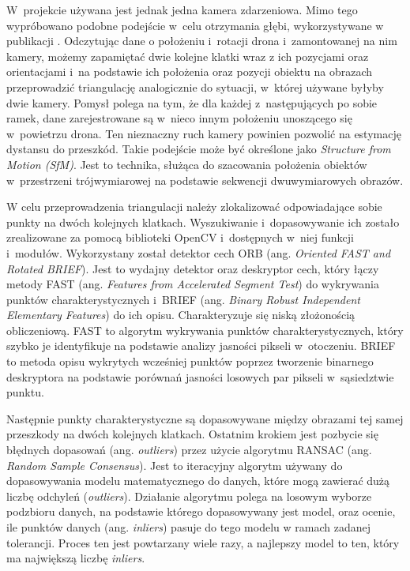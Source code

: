 W~projekcie używana jest jednak jedna kamera zdarzeniowa. Mimo tego wypróbowano podobne podejście w~celu otrzymania głębi, wykorzystywane w publikacji \cite{night_obstacle}. Odczytując dane o położeniu i~rotacji drona i~zamontowanej na nim kamery, możemy zapamiętać dwie kolejne klatki wraz z ich pozycjami oraz orientacjami i~na podstawie ich położenia oraz pozycji obiektu na obrazach przeprowadzić triangulację analogicznie do sytuacji, w~której używane byłyby dwie kamery. Pomysł polega na tym, że dla każdej z~następujących po sobie ramek, dane zarejestrowane są w~nieco innym położeniu unoszącego się w~powietrzu drona. Ten nieznaczny ruch kamery powinien pozwolić na estymację dystansu do przeszkód. Takie podejście może być określone jako \textit{Structure from Motion (SfM)}. Jest to technika, służąca do szacowania położenia obiektów w~przestrzeni trójwymiarowej na podstawie sekwencji dwuwymiarowych obrazów.


W celu przeprowadzenia triangulacji należy zlokalizować odpowiadające sobie punkty na dwóch kolejnych klatkach. Wyszukiwanie i~dopasowywanie ich zostało zrealizowane za pomocą biblioteki OpenCV i~dostępnych w~niej funkcji i~modułów. Wykorzystany został detektor cech ORB (ang. \textit{Oriented FAST and Rotated BRIEF}). Jest to wydajny detektor oraz deskryptor cech, który łączy metody FAST (ang. \textit{Features from Accelerated Segment Test}) do wykrywania punktów charakterystycznych i~BRIEF (ang. \textit{Binary Robust Independent Elementary Features}) do ich opisu. Charakteryzuje się niską złożonością obliczeniową. FAST to algorytm wykrywania punktów charakterystycznych, który szybko je identyfikuje na podstawie analizy jasności pikseli w~otoczeniu. BRIEF to metoda opisu wykrytych wcześniej punktów poprzez tworzenie binarnego deskryptora na podstawie porównań jasności losowych par pikseli w~sąsiedztwie punktu.

Następnie punkty charakterystyczne są dopasowywane między obrazami tej samej przeszkody na dwóch kolejnych klatkach. Ostatnim krokiem jest pozbycie się błędnych dopasowań (ang. \textit{outliers}) przez użycie algorytmu RANSAC (ang. \textit{Random Sample Consensus}). Jest to iteracyjny algorytm używany do dopasowywania modelu matematycznego do danych, które mogą zawierać dużą liczbę odchyleń (\textit{outliers}). Działanie algorytmu polega na losowym wyborze podzbioru danych, na podstawie którego dopasowywany jest model, oraz ocenie, ile punktów danych (ang. \textit{inliers}) pasuje do tego modelu w ramach zadanej tolerancji. Proces ten jest powtarzany wiele razy, a najlepszy model to ten, który ma największą liczbę \textit{inliers}.

